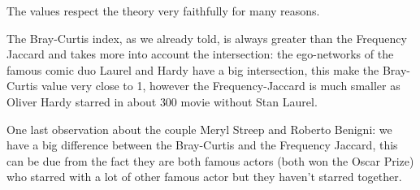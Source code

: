 	The values respect the theory very faithfully for many reasons.
	
	The Bray-Curtis index, as we already told, is always greater than the Frequency Jaccard and takes more into account the intersection:
	the ego-networks of the famous comic duo Laurel and Hardy have a big intersection, this make the Bray-Curtis value very close to 1, however the Frequency-Jaccard is much smaller as Oliver Hardy starred in about $300$ movie without Stan Laurel.
	
	One last observation about the couple Meryl Streep and Roberto Benigni: we have a big difference between the Bray-Curtis and the Frequency Jaccard, this can be due from the fact they are both famous actors (both won the Oscar Prize) who starred with a lot of other famous actor but they haven't starred together.